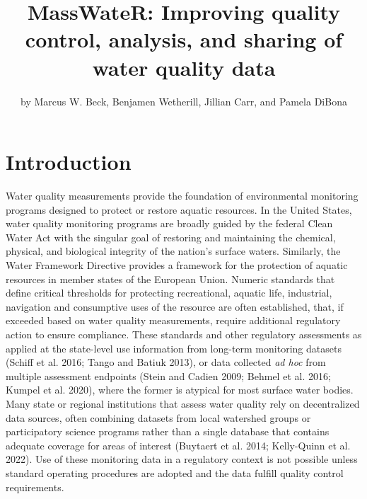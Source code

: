 \title{MassWateR: Improving quality control, analysis, and sharing of water quality data}
\author{by Marcus W. Beck, Benjamen Wetherill, Jillian Carr, and Pamela DiBona}

\maketitle


\hypertarget{introduction}{%
\section{Introduction}\label{introduction}}

Water quality measurements provide the foundation of environmental monitoring programs designed to protect or restore aquatic resources. In the United States, water quality monitoring programs are broadly guided by the federal Clean Water Act with the singular goal of restoring and maintaining the chemical, physical, and biological integrity of the nation's surface waters. Similarly, the Water Framework Directive provides a framework for the protection of aquatic resources in member states of the European Union. Numeric standards that define critical thresholds for protecting recreational, aquatic life, industrial, navigation and consumptive uses of the resource are often established, that, if exceeded based on water quality measurements, require additional regulatory action to ensure compliance. These standards and other regulatory assessments as applied at the state-level use information from long-term monitoring datasets (Schiff et al. 2016; Tango and Batiuk 2013), or data collected \emph{ad hoc} from multiple assessment endpoints (Stein and Cadien 2009; Behmel et al. 2016; Kumpel et al. 2020), where the former is atypical for most surface water bodies. Many state or regional institutions that assess water quality rely on decentralized data sources, often combining datasets from local watershed groups or participatory science programs rather than a single database that contains adequate coverage for areas of interest (Buytaert et al. 2014; Kelly-Quinn et al. 2022). Use of these monitoring data in a regulatory context is not possible unless standard operating procedures are adopted and the data fulfill quality control requirements.

